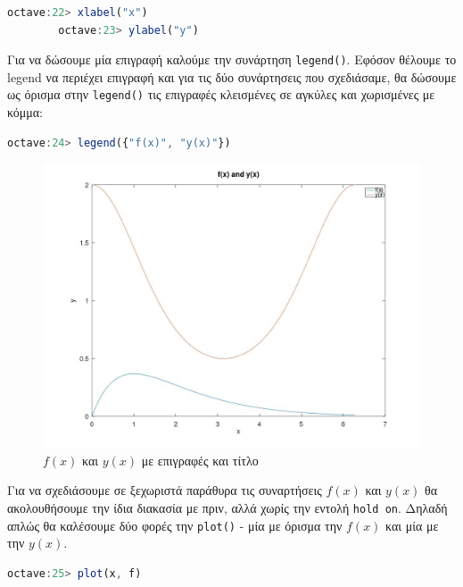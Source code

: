\documentclass{article}
\begin{document}
\begin{lstlisting}[language=octave]
        octave:22> xlabel("x")
        octave:23> ylabel("y")
\end{lstlisting}

Για να δώσουμε μία επιγραφή καλούμε την συνάρτηση \lstinline{legend()}.
Εφόσον θέλουμε το legend να περιέχει επιγραφή και για τις δύο συνάρτησεις
που σχεδιάσαμε, θα δώσουμε ως όρισμα στην \lstinline{legend()} τις επιγραφές
κλεισμένες σε αγκύλες και χωρισμένες με κόμμα:

\begin{lstlisting}[language=octave]
        octave:24> legend({"f(x)", "y(x)"})
\end{lstlisting}

\begin{figure}[H]
        \centering
        \includegraphics[width=\linewidth]{res/fig3.jpg}
        \caption{$f(x)$ και $y(x)$ με επιγραφές και τίτλο}
\end{figure}

Για να σχεδιάσουμε σε ξεχωριστά παράθυρα τις συναρτήσεις $f(x)$ και $y(x)$
θα ακολουθήσουμε την ίδια διακασία με πριν, αλλά χωρίς την εντολή
\lstinline{hold on}. Δηλαδή απλώς θα καλέσουμε δύο φορές την
\lstinline{plot()} - μία με όρισμα την $f(x)$ και μία με την $y(x)$.

\begin{lstlisting}[language=octave]
        octave:25> plot(x, f)
\end{lstlisting}
\end{document}
